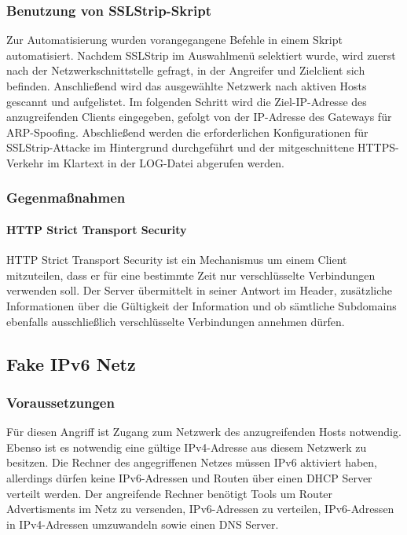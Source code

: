 \subsubsection*{Benutzung von SSLStrip-Skript}
Zur Automatisierung wurden vorangegangene Befehle in einem Skript automatisiert. Nachdem SSLStrip im Auswahlmenü selektiert wurde, wird zuerst nach der Netzwerkschnittstelle gefragt, in der Angreifer und Zielclient sich befinden. Anschließend wird das ausgewählte Netzwerk nach aktiven Hosts gescannt und aufgelistet. Im folgenden Schritt wird die Ziel-IP-Adresse des anzugreifenden Clients eingegeben, gefolgt von der IP-Adresse des Gateways für ARP-Spoofing. Abschließend werden die erforderlichen Konfigurationen für SSLStrip-Attacke im Hintergrund durchgeführt und der mitgeschnittene HTTPS-Verkehr im Klartext in der LOG-Datei abgerufen werden.
 
 
\subsubsection*{Gegenmaßnahmen}

\paragraph*{HTTP Strict Transport Security}
HTTP Strict Transport Security ist ein Mechanismus um einem Client mitzuteilen, dass er für eine bestimmte Zeit nur verschlüsselte Verbindungen verwenden soll. Der Server übermittelt in seiner Antwort im Header, zusätzliche Informationen über die Gültigkeit der Information und ob sämtliche Subdomains ebenfalls ausschließlich verschlüsselte Verbindungen annehmen dürfen. \cite{hsts} \newpage


\subsection{Fake IPv6 Netz}

\subsubsection*{Voraussetzungen}
Für diesen Angriff ist Zugang zum Netzwerk des anzugreifenden Hosts notwendig. Ebenso ist es notwendig eine gültige IPv4-Adresse aus diesem Netzwerk zu besitzen. Die Rechner des angegriffenen Netzes müssen IPv6 aktiviert haben, allerdings dürfen keine IPv6-Adressen und Routen über einen DHCP Server verteilt werden.
Der angreifende Rechner benötigt Tools um Router Advertisments im Netz zu versenden, IPv6-Adressen zu verteilen, IPv6-Adressen in IPv4-Adressen umzuwandeln sowie einen DNS Server.

